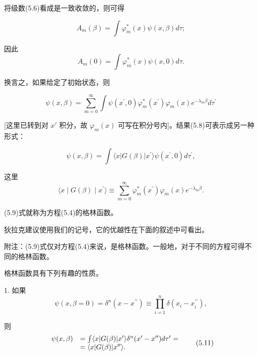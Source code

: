 将级数(5.6)看成是一致收敛的，则可得

\begin{equation*}
A _ {m} (\beta) = \int \varphi_ {m} ^ {*} (x) \psi (x, \beta) d \tau ;
\end{equation*}

因此
\begin{equation*}
A _ {m} (0) = \int \varphi_ {m} ^ {*} (x) \psi (x, 0) d \tau .
\end{equation*}

换言之，如果给定了初始状态，则

\begin{equation*}
\psi (x, \beta) = \sum_ {m = 0} ^ {\infty} \int \psi (x ^ {\prime}, 0) \varphi_ {m} ^ {*} (x ^ {\prime}) \varphi_ {m} (x) e ^ {- \lambda_ {m} \beta} d \tau^ {\prime}\tag{5.8}
\end{equation*}

[这里已转到对 $x'$ 积分，故 $\varphi_{m}(x)$ 可写在积分号内]。结果(5.8)可表示成另一种形式：

\begin{equation*}
\psi (x, \beta) = \int \langle x | G (\beta) | x ^ {\prime} \rangle \psi (x ^ {\prime}, 0) d \tau^ {\prime},
\end{equation*}

这里
\begin{equation*}
\langle x \mid G (\beta) \mid x ^ {\prime} \rangle \equiv \sum_ {m = 0} ^ {\infty} \varphi_ {m} ^ {*} (x ^ {\prime}) \varphi_ {m} (x) e ^ {- \lambda_ {m} \beta}.\tag{5.9}
\end{equation*}

(5.9)式就称为方程(5.4)的格林函数。

狄拉克建议使用我们的记号，它的优越性在下面的叙述中可看出。

附注：(5.9)式仅对方程(5.4)来说，是格林函数。一般地，对于不同的方程可得不同的格林函数。

格林函数具有下列有趣的性质。

1. 如果
\begin{equation*}
\psi (x, \beta = 0) = \delta^ {n} (x - x ^ {\prime \prime}) \equiv \prod_ {i = 1} ^ {n} \delta (x _ {i} - x _ {i} ^ {\prime \prime}),\tag{5.10}
\end{equation*}

则
\begin{equation*}
\begin{array}{r l} \psi (x, \beta) & = \int \langle x | G (\beta) | x ^ {\prime} \rangle \delta^ {n} (x ^ {\prime} - x ^ {\prime \prime}) d \tau^ {\prime} = \\ & = \langle x | G (\beta) | x ^ {\prime \prime} \rangle . \end{array}\tag{5.11}
\end{equation*}

